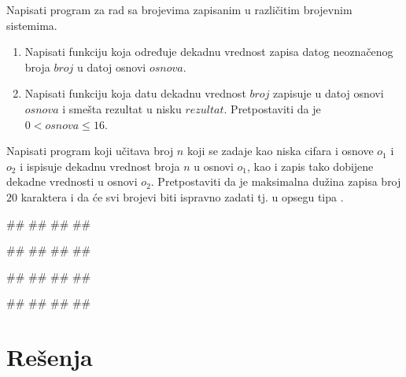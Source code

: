 \begin{Exercise}[difficulty=1, label=NIS_31] 
Napisati program za rad sa brojevima zapisanim u različitim brojevnim sistemima.
\begin{enumerate}
\setlength\itemsep{0em}
\item Napisati funkciju  koja
određuje dekadnu vrednost zapisa datog neoznačenog broja $broj$ u datoj osnovi $osnova$. 
\item Napisati funkciju  
koja datu dekadnu vrednost $broj$ zapisuje u datoj osnovi $osnova$ i smešta rezultat u nisku $rezultat$. 
Pretpostaviti da je $0 < osnova \leq 16$.  
\end{enumerate}

Napisati program koji učitava broj $n$ koji se zadaje kao niska cifara i osnove $o_1$ i $o_2$ i ispisuje dekadnu vrednost broja $n$ u osnovi $o_1$, kao i zapis tako dobijene dekadne vrednosti u osnovi $o_2$.
Pretpostaviti da je maksimalna dužina zapisa broj $20$ karaktera i  da će svi brojevi biti ispravno zadati tj. u opsegu tipa . 

\begin{miditest}
\begin{upotreba}{1}
#\naslovInt#
##
##
##
\end{upotreba}
\end{miditest}
\begin{miditest}
\begin{upotreba}{2}
#\naslovInt#
##
##
##
\end{upotreba}
\end{miditest}

\begin{miditest}
\begin{upotreba}{3}
#\naslovInt#
##
##
##
\end{upotreba}
\end{miditest}
\begin{miditest}
\begin{upotreba}{4}
#\naslovInt#
##
##
##
\end{upotreba}
\end{miditest}
\end{Exercise}
\ifresenja
\begin{Answer}[ref=NIS_31]
\end{Answer}
\fi

\ifresenja
\sstrana
\section{Rešenja}
\shipoutAnswer
\fi

